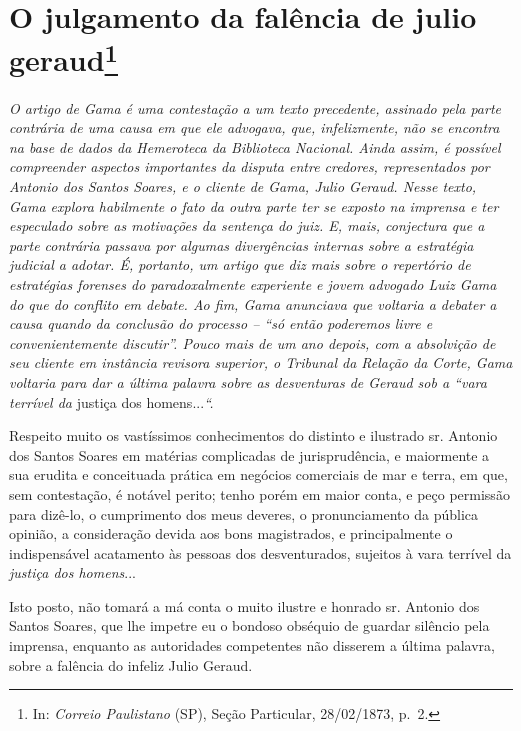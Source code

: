 \chapter{O julgamento da falência de julio geraud\footnote{ In: \emph{Correio Paulistano} (SP), Seção Particular,
  28/02/1873, p.~2.}} %

\begin{didascalia}
\emph{O artigo de Gama é uma contestação a um texto precedente, assinado
pela parte contrária de uma causa em que ele advogava, que,
infelizmente, não se encontra na base de dados da Hemeroteca da
Biblioteca Nacional. Ainda assim, é possível compreender aspectos
importantes da disputa entre credores, representados por Antonio dos
Santos Soares, e o cliente de Gama, Julio Geraud. Nesse texto, Gama
explora habilmente o fato da outra parte ter se exposto na imprensa e
ter especulado sobre as motivações da sentença do juiz. E, mais,
conjectura que a parte contrária passava por algumas divergências
internas sobre a estratégia judicial a adotar. É, portanto, um artigo
que diz mais sobre o repertório de estratégias forenses do
paradoxalmente experiente e jovem advogado Luiz Gama do que do conflito
em debate. Ao fim, Gama anunciava que voltaria a debater a causa quando
da conclusão do processo -- ``só então poderemos livre e convenientemente
discutir''. Pouco mais de um ano depois, com a absolvição de seu cliente
em instância revisora superior, o Tribunal da Relação da Corte, Gama
voltaria para dar a última palavra sobre as desventuras de Geraud sob a
``vara terrível da} justiça dos homens...\emph{``.}
\end{didascalia}

\asterisc{}

Respeito muito os vastíssimos conhecimentos do distinto e ilustrado sr.
Antonio dos Santos Soares em matérias complicadas de jurisprudência, e
maiormente a sua erudita e conceituada prática em negócios comerciais de
mar e terra, em que, sem contestação, é notável perito; tenho porém em
maior conta, e peço permissão para dizê-lo, o cumprimento dos meus
deveres, o pronunciamento da pública opinião, a consideração devida aos
bons magistrados, e principalmente o indispensável acatamento às pessoas
dos desventurados, sujeitos à vara terrível da \emph{justiça dos
homens}...

Isto posto, não tomará a má conta o muito ilustre e honrado sr. Antonio
dos Santos Soares, que lhe impetre eu o bondoso obséquio de guardar
silêncio pela imprensa, enquanto as autoridades competentes não disserem
a última palavra, sobre a falência do infeliz Julio Geraud.

